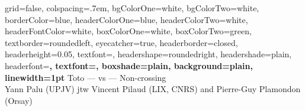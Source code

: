 \documentclass[portrait,final,a0paper,fontscale=0.25]{baposter}
\theoremstyle{definition}
\begin{document}

\begin{poster}%
  {
  grid=false,
  colspacing=.7em,
  bgColorOne=white,
  bgColorTwo=white,
  borderColor=blue,
  headerColorOne=blue,
  headerColorTwo=white,
  headerFontColor=white,
  boxColorOne=white,
  boxColorTwo=green,
  textborder=roundedleft,
  eyecatcher=true,
  headerborder=closed,
  headerheight=0.05\textheight,
  textfont=\Huge,
  headershape=roundedright,
  headershade=plain,
  headerfont=\Large\bf, %
  textfont={\setlength{\parindent}{0pt}},
  boxshade=plain,
  background=plain,
  linewidth=1pt
  }
  {Toto}
  {{\fontsize{24}{25} \; --- \; {\color{red} vs} \; --- \; {\color{blue} Non-crossing}} \\ {\Large \rm Yann Palu} {\normalsize (UPJV) jtw} {\Large \rm Vincent Pilaud} {\normalsize (LIX, CNRS) and} {\Large \rm Pierre-Guy Plamondon} {\normalsize (Orsay)} \vspace*{-.5cm}}
  {}
  {}
  

\end{poster}
\end{document}

